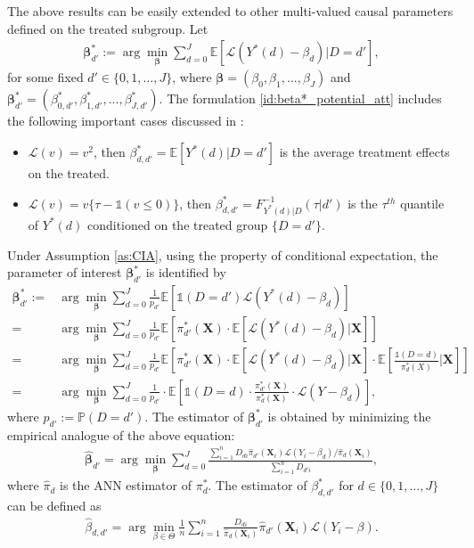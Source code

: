 \documentclass[11pt]{article}
\numberwithin{equation}{section}
\begin{document}
The above results can be easily extended to other multi-valued causal parameters defined on the treated subgroup. Let
\begin{align}\label{id:beta*_potential_att}
	\boldsymbol{\beta}_{d'}^*:=\arg\min_{\boldsymbol{\beta}}\sum_{d=0}^J\mathbb{E}\left[\mathcal{L}\left(Y^*(d)-\beta_d\right)|D=d'\right],
\end{align}
for some fixed $d'\in\{0,1,...,J\}$, where $\boldsymbol{\beta}=(\beta_0,\beta_1,...,\beta_J)$ and $\boldsymbol{\beta}_{d'}^*=(\beta^*_{0,d'},\beta^*_{1,d'},...,\beta^*_{J,d'})$. The formulation \eqref{id:beta*_potential_att} includes the following important cases discussed in \cite{lee2018efficient}:
\begin{itemize}
	\item $\mathcal{L}(v)=v^2$, then $\beta^*_{d,d'}=\mathbb{E}[Y^*(d)|D=d']$ is the average treatment effects on the treated.
	\item $\mathcal{L}(v)=v\{\tau-\mathds{1}(v\leq 0)\}$, then $\beta^*_{d,d'}=F_{Y^*(d)|D}^{-1}(\tau|d')$ is the $\tau^{th}$ quantile of $Y^*(d)$ conditioned on the treated group $\{D=d'\}$.
\end{itemize}
Under Assumption \ref{as:CIA}, using the property of conditional expectation, the parameter of interest $\boldsymbol{\beta}_{d'}^*$ is identified by
\begin{align*}
	\boldsymbol{\beta}_{d'}^*:=&\arg\min_{\boldsymbol{\beta}}\sum_{d=0}^J\frac{1}{p_{d'}}\mathbb{E}\left[\mathds{1}(D=d')\mathcal{L}\left(Y^*(d)-\beta_d\right)\right]\\
	=&\arg\min_{\boldsymbol{\beta}}\sum_{d=0}^J\frac{1}{p_{d'}}\mathbb{E}\left[\pi^*_{d'}(\boldsymbol{X})\cdot \mathbb{E}[\mathcal{L}\left(Y^*(d)-\beta_d\right)|\boldsymbol{X}]\right]\\
	=&\arg\min_{\boldsymbol{\beta}}\sum_{d=0}^J\frac{1}{p_{d'}}\mathbb{E}\left[ \pi^*_{d'}(\boldsymbol{X})\cdot \mathbb{E}\left[\mathcal{L}\left(Y^*(d)-\beta_d\right)|\boldsymbol{X}\right]\cdot \mathbb{E}\left[\frac{\mathds{1}(D=d)}{\pi^*_{d}(X)}\bigg|\boldsymbol{X}\right]\right]\\
	=&\arg\min_{\boldsymbol{\beta}}\sum_{d=0}^J\frac{1}{p_{d'}}\cdot \mathbb{E}\left[\mathds{1}(D=d)\cdot \frac{\pi^*_{d'}(\boldsymbol{X})}{\pi^*_{d}(\boldsymbol{X})}\cdot \mathcal{L}\left(Y-\beta_d\right)\right],
\end{align*}
where $p_{d'}:=\mathbb{P}(D=d')$. The estimator of $\boldsymbol{\beta}_{d'}^*$ is obtained by minimizing the empirical analogue of the above equation:
\begin{align*}	\widehat{\boldsymbol{\beta}}_{d'}=\arg\min_{\boldsymbol{\beta}}\sum_{d=0}^J\frac{\sum_{i=1}^nD_{di}\widehat{\pi}_{d'}(\boldsymbol{X}_{i}) \mathcal{L}\left(Y_i-\beta_d\right)/\widehat{\pi}_{d}(\boldsymbol{X}_{i})}{\sum_{i=1}^nD_{d'i}},
\end{align*}
where $\widehat{\pi}_{d}$ is the ANN estimator of $\pi^*_{d}$. The estimator of $\beta^*_{d,d'}$ for $d\in\{0,1,...,J\}$ can be defined as
\begin{align*}	\widehat{\beta}_{d,d'}=\arg\min_{\beta\in\Theta}\frac{1}{n}\sum_{i=1}^n\frac{D_{di}}{\widehat{\pi}_{d}(\boldsymbol{X}_{i})}\widehat{\pi}_{d'}(\boldsymbol{X}_{i}) \mathcal{L}\left(Y_i-\beta\right).
\end{align*}
\end{document}
